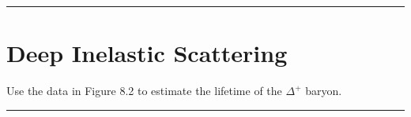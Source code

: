 
\noindent\rule{7in}{2.8pt}
\section{Deep Inelastic Scattering}
    
\begin{problem}{8.1}
Use the data in Figure 8.2 to estimate the lifetime of the $\Delta^+$ baryon.
\end{problem}
\begin{solution}

\end{solution}

\noindent\rule{7in}{1.5pt}


